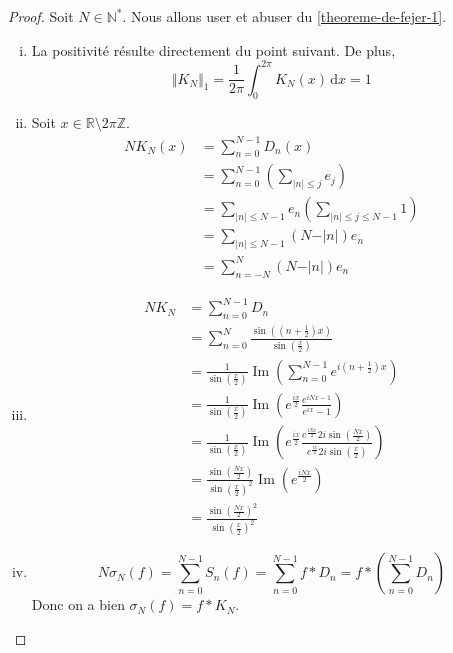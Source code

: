 	\begin{proof}
		Soit $N\in\mathbb{N}^*$. Nous allons user et abuser du \cref{theoreme-de-fejer-1}.
		\begin{enumerate}[(i)]
			\item La positivité résulte directement du point suivant. De plus,
			\[ \Vert K_N \Vert_1 = \frac{1}{2\pi} \int_0^{2\pi} K_N(x) \, \mathrm{d}x = 1 \]
			\item Soit $x\in\mathbb{R}\setminus 2\pi\mathbb{Z}$.
			\begin{align*}
				NK_N(x)&=\sum_{n=0}^{N-1} D_n(x) \\
				&= \sum_{n=0}^{N-1} \left( \sum_{\vert n \vert \leq j} e_j \right) \\
				&= \sum_{\vert n \vert \leq N-1} e_n \left( \sum_{\vert n \vert \leq j \leq N-1} 1 \right) \\
				&= \sum_{\vert n \vert \leq N-1} (N - \vert n \vert) e_n \\
				&= \sum_{n=-N}^{N} (N - \vert n \vert) e_n
			\end{align*}
			\item \begin{align*}
				NK_N&=\sum_{n=0}^{N-1}{D_n} \\
				&=\sum_{n=0}^{N}{\frac{\sin \left( \left( n + \frac{1}{2} \right) x \right)}{\sin \left ( \frac{x}{2} \right)}} \\
				&=\frac{1}{\sin \left ( \frac{x}{2} \right)}\operatorname{Im} \left( \sum_{n=0}^{N-1}{e^{i(n+\frac{1}{2})x}} \right) \\
				&=\frac{1}{\sin \left ( \frac{x}{2} \right)}\operatorname{Im} \left ( e^{\frac{ix}{2}}\frac{e^{iNx-1}}{e^{ix}-1} \right) \\
				&=\frac{1}{\sin \left ( \frac{x}{2} \right)} \operatorname{Im} \left ( e^{\frac{ix}{2}}\frac{e^{\frac{iNx}{2}}2i\sin \left( \frac{Nx}{2} \right)}{e^{\frac{ix}{2}}2i \sin \left ( \frac{x}{2} \right)} \right ) \\
				&=\frac{\sin \left( \frac{Nx}{2} \right)}{\sin \left ( \frac{x}{2} \right)^2}\operatorname{Im} \left(e^{\frac{iNx}{2}} \right) \\
				&=\frac{\sin \left( \frac{Nx}{2} \right)^2}{\sin \left ( \frac{x}{2} \right)^2}
			\end{align*}
			\item \[ N \sigma_N(f) = \sum_{n=0}^{N-1} S_n(f) = \sum_{n=0}^{N-1} f * D_n = f * \left (\sum_{n=0}^{N-1} D_n \right) \]
			Donc on a bien $\sigma_N(f) = f * K_N$.
		\end{enumerate}
	\end{proof}

